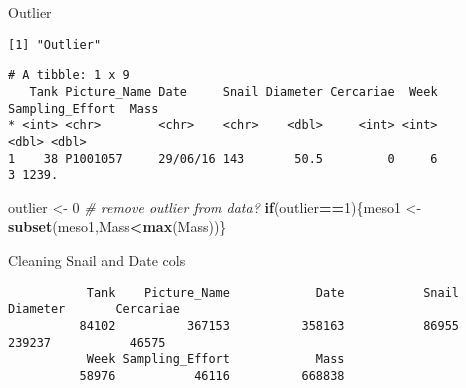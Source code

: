 \documentclass[10,portrait]{article}
\newenvironment{Shaded}{\begin{snugshade}}{\end{snugshade}}
\newcommand{\KeywordTok}[1]{\textcolor[rgb]{0.13,0.29,0.53}{\textbf{#1}}}
\newcommand{\DecValTok}[1]{\textcolor[rgb]{0.00,0.00,0.81}{#1}}
\newcommand{\StringTok}[1]{\textcolor[rgb]{0.31,0.60,0.02}{#1}}
\newcommand{\CommentTok}[1]{\textcolor[rgb]{0.56,0.35,0.01}{\textit{#1}}}
\newcommand{\ControlFlowTok}[1]{\textcolor[rgb]{0.13,0.29,0.53}{\textbf{#1}}}
\newcommand{\OperatorTok}[1]{\textcolor[rgb]{0.81,0.36,0.00}{\textbf{#1}}}
\newcommand{\NormalTok}[1]{#1}
\begin{document}
Outlier

\begin{Shaded}
\end{Shaded}

\begin{verbatim}
[1] "Outlier"
\end{verbatim}

\begin{verbatim}
# A tibble: 1 x 9
   Tank Picture_Name Date     Snail Diameter Cercariae  Week Sampling_Effort  Mass
* <int> <chr>        <chr>    <chr>    <dbl>     <int> <int>           <dbl> <dbl>
1    38 P1001057     29/06/16 143       50.5         0     6               3 1239.
\end{verbatim}

\begin{Shaded}
\begin{Highlighting}[]
\NormalTok{outlier <-}\StringTok{ }\DecValTok{0} \CommentTok{# remove outlier from data?}
\ControlFlowTok{if}\NormalTok{(outlier}\OperatorTok{==}\DecValTok{1}\NormalTok{)\{meso1 <-}\StringTok{ }\KeywordTok{subset}\NormalTok{(meso1,Mass}\OperatorTok{<}\KeywordTok{max}\NormalTok{(Mass))\}}
\end{Highlighting}
\end{Shaded}

Cleaning Snail and Date cols

\begin{Shaded}
\end{Shaded}

\begin{verbatim}
           Tank    Picture_Name            Date           Snail        Diameter       Cercariae 
          84102          367153          358163           86955          239237           46575 
           Week Sampling_Effort            Mass 
          58976           46116          668838 
\end{verbatim}
\end{document}
